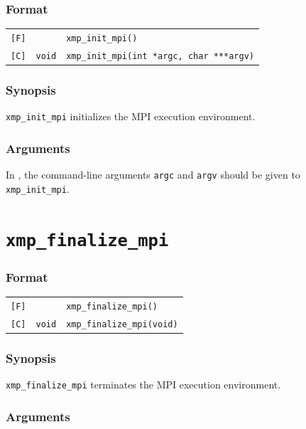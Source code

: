 \subsubsection*{Format}

\begin{tabular}{lll}
\verb![F]!&  {\tt }& {\tt xmp\_init\_mpi()}\\

\verb![C]!&  {\tt void}& {\tt xmp\_init\_mpi(int *argc, char ***argv)}
\end{tabular}

\subsubsection*{Synopsis}

   {\tt xmp\_init\_mpi} initializes the MPI execution environment.

\subsubsection*{Arguments}

   In {\XMPC}, the command-line arguments {\tt argc} and {\tt argv}
   should be given to {\tt xmp\_init\_mpi}.


\section{\tt xmp\_finalize\_mpi}

\subsubsection*{Format}

\begin{tabular}{lll}
\verb![F]!&  {\tt }& {\tt xmp\_finalize\_mpi()}\\

\verb![C]!&  {\tt void}& {\tt xmp\_finalize\_mpi(void)}
\end{tabular}

\subsubsection*{Synopsis}

   {\tt xmp\_finalize\_mpi} terminates the MPI execution environment.

\subsubsection*{Arguments}

